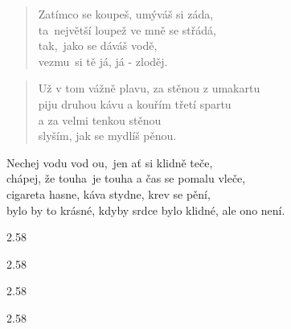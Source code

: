 \begin{song}{}
\begin{verse}
   Zatímco se koupeš, umýváš si záda, \\
   ta~největší loupež ve mně se střádá, \\
   tak,~jako se dáváš vodě, \\
   vezmu~si tě já, já - zloděj.
\end{verse}
\begin{verse}
   Už v tom vážně plavu, za stěnou z umakartu \\
   piju druhou kávu a kouřím třetí spartu \\
   a za velmi tenkou stěnou \\
   slyším, jak se mydlíš pěnou.
\end{verse}
\begin{refren}
   Nechej vodu vod ou,~jen ať si klidně teče, \\
   chápej, že touha~je touha a čas se pomalu vleče, \\
   cigareta hasne, káva stydne, krev se pění, \\
   bylo by to krásné, kdyby srdce bylo klidné, ale ono není.
\end{refren}

  \begin{tab}
    \begin{tabbar}{2.5}{8}
      \tabchordHm
    \end{tabbar}
    \begin{tabbar}{2.5}{8}
    \end{tabbar}
    \tabdots
    \begin{tabbar}{2.5}{8}
    \end{tabbar}
    \tabdots
    \begin{tabbar}{2.5}{8}
    \end{tabbar}
  \end{tab}



\end{song}

